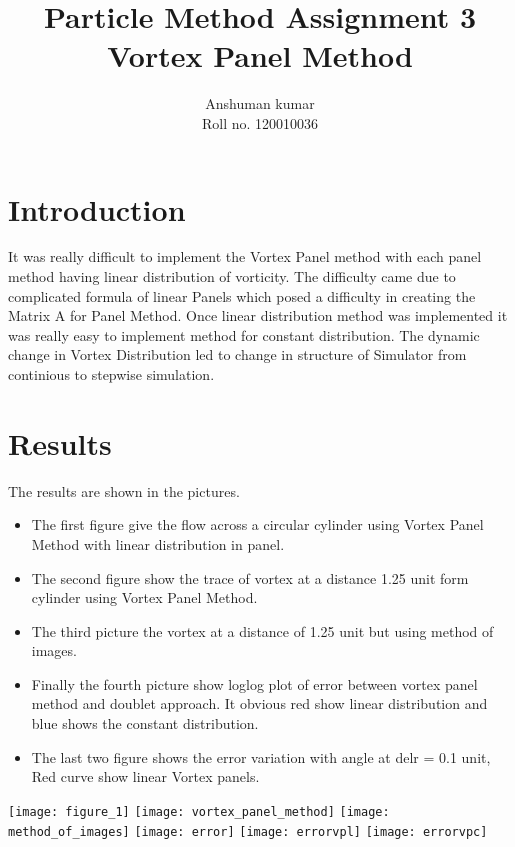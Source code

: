 \documentclass[12pt]{article}
\title {Particle Method Assignment 3 \\
Vortex Panel Method }
\author {Anshuman kumar \\
Roll no.  120010036}
\begin{document}
\maketitle

\section{Introduction}
It was really difficult to implement the Vortex Panel method with each panel method having linear distribution
of vorticity. The difficulty came due to complicated formula of linear Panels which posed a difficulty in creating
the Matrix A for Panel Method. Once linear distribution method was implemented it was really easy to implement method
for constant distribution. The dynamic change in Vortex Distribution led to change in structure of Simulator from continious
to stepwise simulation.

\section{Results}
        The results are shown in the pictures. 
\begin{itemize}
    \item The first figure give the flow 
        across a circular cylinder using Vortex Panel Method with linear distribution in panel.
    \item The second figure show the trace of vortex at a distance 1.25 unit form cylinder using Vortex Panel Method.
    \item The third picture the vortex at a distance of 1.25 unit but using method of images.
    \item Finally the fourth picture show loglog plot of error between vortex panel method and doublet approach. It obvious red show linear distribution and blue shows the constant distribution.
    \item The last two figure shows the error variation with angle at delr = 0.1 unit, Red curve show linear Vortex panels.
\end{itemize}
\texttt{[image: figure\_1]}
\texttt{[image: vortex\_panel\_method]}
\texttt{[image: method\_of\_images]}
\texttt{[image: error]}
\texttt{[image: errorvpl]}
\texttt{[image: errorvpc]}
\end{document}
